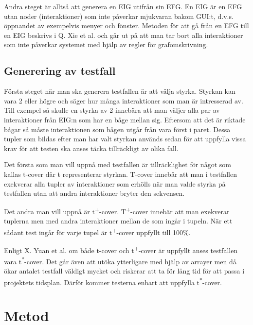 Andra steget är alltså att generera en EIG utifrån sin EFG. En EIG är en EFG utan noder (interaktioner) som inte påverkar mjukvaran bakom GUI:t, d.v.s. öppnandet av exempelvis menyer och fönster. Metoden för att gå från en EFG till en EIG beskrivs i Q. Xie et al. \cite{xie2008using} och går ut på att man tar bort alla interaktioner som inte påverkar systemet med hjälp av regler för grafomskrivning. \cite{yuan2011gui}

\subsection{Generering av testfall}

Första steget när man ska generera testfallen är att välja styrka. Styrkan kan vara 2 eller högre och säger hur många interaktioner som man är intresserad av. Till exempel så skulle en styrka av 2 innebära att man väljer alla par av interaktioner från EIG:n som har en båge mellan sig. Eftersom att det är riktade bågar så måste interaktionen som bågen utgår från vara först i paret. Dessa tupler som bildas efter man har valt styrkan används sedan för att uppfylla vissa krav för att testen ska anses täcka tillräckligt av olika fall. \cite{yuan2011gui}

Det första som man vill uppnå med testfallen är tillräcklighet för något som kallas t-cover där t representerar styrkan. T-cover innebär att man i testfallen exekverar alla tupler av interaktioner som erhölls när man valde styrka på testfallen utan att andra interaktioner bryter den sekvensen. \cite{yuan2011gui}

Det andra man vill uppnå är t\textsuperscript{+}-cover. T\textsuperscript{+}-cover innebär att man exekverar tuplerna men med andra interaktioner mellan de som ingår i tupeln. När ett sådant test ingår för varje tupel är t\textsuperscript{+}-cover uppfyllt till 100\%. \cite{yuan2011gui}

Enligt X. Yuan et al. \cite{yuan2011gui} om både t-cover och t\textsuperscript{+}-cover är uppfyllt anses testfallen vara t\textsuperscript{*}-cover. Det går även att utöka ytterligare med hjälp av arrayer men då ökar antalet testfall väldigt mycket och riskerar att ta för lång tid för att passa i projektets tidsplan. Därför kommer testerna enbart att uppfylla t\textsuperscript{*}-cover.

\section{Metod}
\label{sec:method-holmberg}

